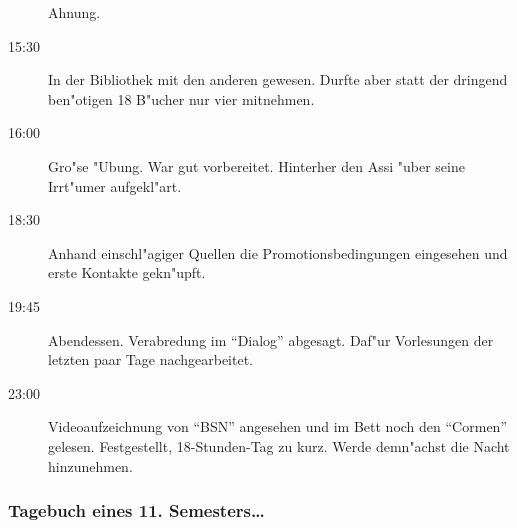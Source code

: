 \begin{description}
Ahnung.
\item[15:30] In der Bibliothek mit den anderen gewesen. Durfte aber statt der
dringend ben"otigen 18 B"ucher nur vier mitnehmen.
\item[16:00] Gro"se "Ubung. War gut vorbereitet. Hinterher den Assi "uber seine
Irrt"umer aufgekl"art.
\item[18:30] Anhand einschl"agiger Quellen die Promotionsbedingungen eingesehen und
erste Kontakte gekn"upft.
\item[19:45] Abendessen. Verabredung im "`Dialog"' abgesagt. Daf"ur Vorlesungen
der letzten paar Tage nachgearbeitet.
\item[23:00] Videoaufzeichnung von "`BSN"' angesehen und im Bett noch den "`Cormen"'
gelesen. Festgestellt, 18-Stunden-Tag zu kurz. Werde demn"achst die Nacht
hinzunehmen.
\end{description}

\newpage
\subsubsection{Tagebuch eines 11. Semesters\ldots}

